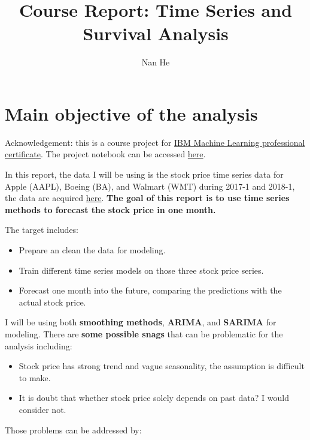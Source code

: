 \documentclass[11pt]{article}
\title{Course Report: Time Series and Survival Analysis}
\author{Nan He}
\date{}
\begin{document}
\maketitle


\section{Main objective of the analysis}\label{section-introduction-1}
Acknowledgement: this is a course project for \href{https://www.coursera.org/professional-certificates/ibm-machine-learning}{IBM Machine Learning professional certificate}. The project notebook can be accessed \href{https://github.com/henankf223/Assignment-6-TS/blob/40f8f0d003b55ed7d9246c2828d0f25b7517e229/Assignmeng_6_TS_stock.ipynb}{here}.

In this report, the data I will be using is the stock price time series data for Apple (AAPL), Boeing (BA), and Walmart (WMT) during 2017-1 and 2018-1, the data are acquired  \href{https://www.kaggle.com/szrlee/stock-time-series-20050101-to-20171231s}{here}.
\textbf{The goal of this report is to use time series methods to forecast the stock price in one month.}

The target includes: 

\begin{itemize}
\item Prepare an clean the data for modeling.
\item Train different time series models on those three stock price series.
\item Forecast one month into the future, comparing the predictions with the actual stock price.
\end{itemize}

I will be using both \textbf{smoothing methods}, \textbf{ARIMA}, and \textbf{SARIMA} for modeling.
There are \textbf{some possible snags} that can be problematic for the analysis including:

\begin{itemize}
\item Stock price has strong trend and vague seasonality, the assumption is difficult to make.
\item It is doubt that whether stock price solely depends on past data? I would consider not.
\end{itemize}

Those problems can be addressed by:
\end{document}
